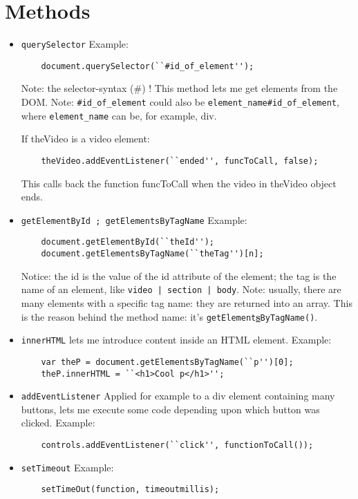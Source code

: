 \documentclass[a4paper,11pt]{book}
\begin{document}
\section{Methods}
\begin{itemize}
	\item \texttt{querySelector}
	Example:
	\begin{verbatim}
	document.querySelector(``#id_of_element'');
	\end{verbatim}
	Note: the selector-syntax (\#) !
	This method lets me get elements from the DOM. Note: \texttt{\#id\_of\_element}
	could also be \texttt{element\_name\#id\_of\_element}, where
	\texttt{element\_name} can be, for example, div.
	
	If theVideo is a video element:
	\begin{verbatim}
	theVideo.addEventListener(``ended'', funcToCall, false);
	\end{verbatim}
	This calls back the function funcToCall when the video in theVideo object ends.
	
	\item \texttt{getElementById ; getElementsByTagName}
	Example:
	\begin{verbatim}
	document.getElementById(``theId'');
	document.getElementsByTagName(``theTag'')[n];
	\end{verbatim}
	Notice: the id is the value of the id attribute of the element; the tag is the
	name of an element, like \texttt{video | section | body}.
	Note: usually, there are many elements with a specific tag name:
	they are returned into an array. This is the reason behind the method name:
	it's \texttt{getElement}\underline{\textbf{s}}\texttt{ByTagName()}.
	
	\item \texttt{innerHTML} lets me introduce content inside an HTML element.
	Example:
	\begin{verbatim}
	var theP = document.getElementsByTagName(``p'')[0];
	theP.innerHTML = ``<h1>Cool p</h1>'';
	\end{verbatim}
	
	\item \texttt{addEventListener}
	Applied for example to a div element containing many buttons, lets me
	execute some code depending upon which button was clicked. 	Example:	
	\begin{verbatim}
	controls.addEventListener(``click'', functionToCall());
	\end{verbatim}
	
	\item \texttt{setTimeout}
	Example:
	\begin{verbatim}
	setTimeOut(function, timeoutmillis);
	\end{verbatim}
	

\end{itemize}
\end{document}
